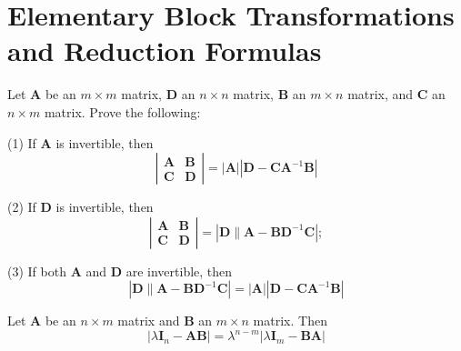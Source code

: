 \documentclass[12pt, a4paper, oneside]{book}
\begin{document}
\section{Elementary Block Transformations and Reduction Formulas}
\begin{theorem}
    Let $\mathbf{A}$ be an $m \times m$ matrix, $\mathbf{D}$ an $n \times n$ matrix, $\mathbf{B}$ an $m \times n$ matrix, and $\mathbf{C}$ an $n \times m$ matrix. Prove the following:

    (1) If $\mathbf{A}$ is invertible, then
    \[
        \left|
        \begin{matrix}
            \mathbf{A} & \mathbf{B} \\
            \mathbf{C} & \mathbf{D}
        \end{matrix}
        \right|
        =
        \left|\mathbf{A}\right|\left|\mathbf{D}-\mathbf{C} \mathbf{A}^{-1} \mathbf{B}\right|
    \]

    (2) If $\mathbf{D}$ is invertible, then
    \[
        \left|
        \begin{matrix}
            \mathbf{A} & \mathbf{B} \\
            \mathbf{C} & \mathbf{D}
        \end{matrix}
        \right|
        =
        \left|\mathbf{D} \| \mathbf{A}-\mathbf{B} \mathbf{D}^{-1} \mathbf{C}\right| ;
    \]

    (3) If both $\mathbf{A}$ and $\mathbf{D}$ are invertible, then
    \[
        \left|\mathbf{D} \| \mathbf{A}-\mathbf{B} \mathbf{D}^{-1} \mathbf{C}\right|=|\mathbf{A}|\left|\mathbf{D}-\mathbf{C} \mathbf{A}^{-1} \mathbf{B}\right|
    \]
\end{theorem}
\begin{corollary}
    Let $\mathbf{A}$ be an $n\times m$ matrix and $\mathbf{B}$ an $m\times n$ matrix. Then
    \[
        \left|\lambda \mathbf{I}_n -\mathbf{A}\mathbf{B}\right|
        =
        \lambda^{n-m}\left|\lambda \mathbf{I}_m -\mathbf{B}\mathbf{A}\right|
    \]
\end{corollary}
\end{document}
